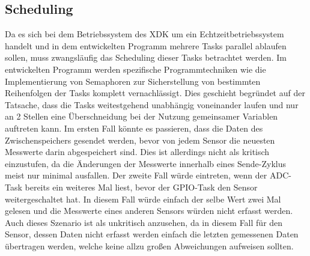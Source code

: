 \subsection{Scheduling}\label{subsec:Scheduling}
Da es sich bei dem Betriebssystem des \acs{XDK} um ein Echtzeitbetriebssystem handelt und in dem entwickelten Programm mehrere Tasks parallel ablaufen sollen, muss zwangsläufig das Scheduling dieser Tasks betrachtet werden. Im entwickelten Programm werden spezifische Programmtechniken wie die Implementierung von Semaphoren zur Sicherstellung von bestimmten Reihenfolgen der Tasks komplett vernachlässigt. Dies geschieht begründet auf der Tatsache, dass die Tasks weitestgehend unabhängig voneinander laufen und nur an 2 Stellen eine Überschneidung bei der Nutzung gemeinsamer Variablen auftreten kann.\newline
\newline
Im ersten Fall könnte es passieren, dass die Daten des Zwischenspeichers gesendet werden, bevor von jedem Sensor die neuesten Messwerte darin abgespeichert sind. Dies ist allerdings nicht als kritisch einzustufen, da die Änderungen der Messwerte innerhalb eines Sende-Zyklus meist nur minimal ausfallen.\newline
Der zweite Fall würde eintreten, wenn der \acs{ADC}-Task bereits ein weiteres Mal liest, bevor der \acs{GPIO}-Task den Sensor weitergeschaltet hat. In diesem Fall würde einfach der selbe Wert zwei Mal gelesen und die Messwerte eines anderen Sensors würden nicht erfasst werden. Auch dieses Szenario ist als unkritisch anzusehen, da in diesem Fall für den Sensor, dessen Daten nicht erfasst werden einfach die letzten gemessenen Daten übertragen werden, welche keine allzu großen Abweichungen aufweisen sollten.
